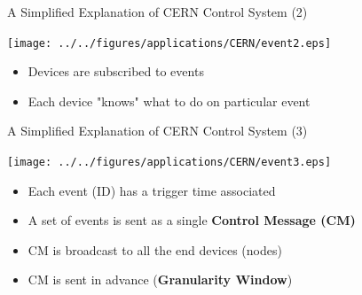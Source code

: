 \documentclass[compress,red]{beamer}
\begin{document}
\begin{frame}{A Simplified Explanation of CERN Control System (2)}

      \begin{center}
      \texttt{[image: ../../figures/applications/CERN/event2.eps]}
      \end{center}

  \begin{itemize}
    \item Devices are subscribed to events 
    \item Each device "knows" what to do on particular event
  \end{itemize}


\end{frame}


\begin{frame}{A Simplified Explanation of CERN Control System (3)}

      \begin{center}
      \texttt{[image: ../../figures/applications/CERN/event3.eps]}
      \end{center}

  \begin{itemize}
    \item Each event (ID) has a trigger time associated
	\item A set of events is sent as a single {\bf Control Message (CM)}
	\item CM is broadcast to all the end devices (nodes)
	\item CM is sent in advance ({\bf Granularity Window})
  \end{itemize}

\end{frame}
\end{document}
